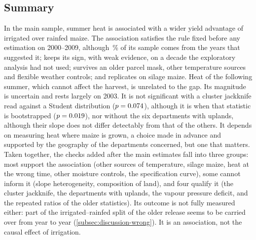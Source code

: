 \subsection{Summary}

In the main sample, summer heat is associated with a wider yield advantage of irrigated over rainfed maize. The association satisfies the rule fixed before any estimation on 2000--2009, although \ExploSharePct\,\% of its sample comes from the years that suggested it; keeps its sign, with weak evidence, on a decade the exploratory analysis had not used; survives an older parcel mask, other temperature sources and flexible weather controls; and replicates on silage maize. Heat of the following summer, which cannot affect the harvest, is unrelated to the gap. Its magnitude is uncertain and rests largely on 2003. It is not significant with a cluster jackknife read against a Student distribution ($p = 0.074$), although it is when that statistic is bootstrapped ($p = 0.019$), nor without the six departments with uplands, although their slope does not differ detectably from that of the others. It depends on measuring heat where maize is grown, a choice made in advance and supported by the geography of the departments concerned, but one that matters. Taken together, the checks added after the main estimates fall into three groups: most support the association (other sources of temperature, silage maize, heat at the wrong time, other moisture controls, the specification curve), some cannot inform it (slope heterogeneity, composition of land), and four qualify it (the cluster jackknife, the departments with uplands, the vapour pressure deficit, and the repeated ratios of the older statistics). Its outcome is not fully measured either: part of the irrigated--rainfed split of the older release seems to be carried over from year to year (\cref{subsec:discussion-wrong}). It is an association, not the causal effect of irrigation.
